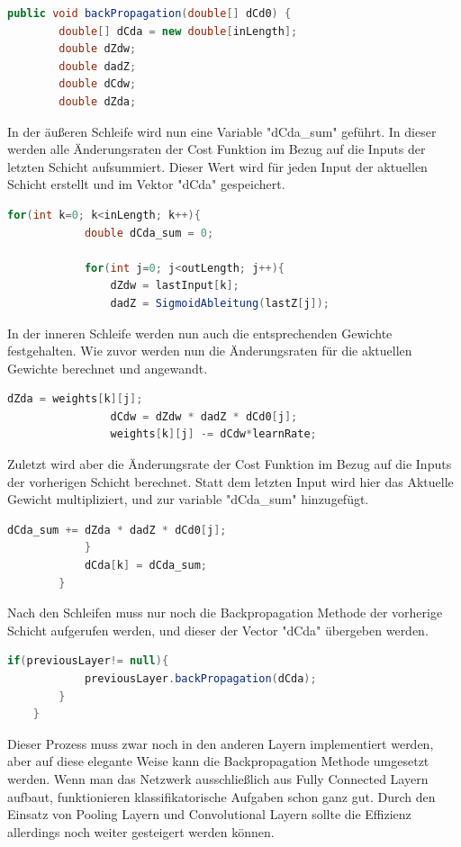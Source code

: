 \documentclass[12pt]{article}
\begin{document}
\begin{lstlisting}[language=Java]
    public void backPropagation(double[] dCd0) {
        double[] dCda = new double[inLength];
        double dZdw;
        double dadZ;
        double dCdw;
        double dZda;
\end{lstlisting} 
In der äußeren Schleife wird nun eine Variable "dCda\_sum" geführt. In dieser werden alle Änderungsraten der Cost Funktion im Bezug auf die Inputs der letzten Schicht aufsummiert. Dieser Wert wird für jeden Input der aktuellen Schicht erstellt und im Vektor "dCda" gespeichert.
\begin{lstlisting}[language=Java]  
        for(int k=0; k<inLength; k++){
            double dCda_sum = 0;

            for(int j=0; j<outLength; j++){
                dZdw = lastInput[k];
                dadZ = SigmoidAbleitung(lastZ[j]);
\end{lstlisting} 
In der inneren Schleife werden nun auch die entsprechenden Gewichte festgehalten. Wie zuvor werden nun die Änderungsraten für die aktuellen Gewichte berechnet und angewandt.
\begin{lstlisting}[language=Java]  
                dZda = weights[k][j]; 
                dCdw = dZdw * dadZ * dCd0[j];
                weights[k][j] -= dCdw*learnRate;
\end{lstlisting} 
Zuletzt wird aber die Änderungsrate der Cost Funktion im Bezug auf die Inputs der vorherigen Schicht berechnet. Statt dem letzten Input wird hier das Aktuelle Gewicht multipliziert, und zur variable "dCda\_sum" hinzugefügt.
\begin{lstlisting}[language=Java]              
                dCda_sum += dZda * dadZ * dCd0[j];
            }
            dCda[k] = dCda_sum;
        }
\end{lstlisting} 
Nach den Schleifen muss nur noch die Backpropagation Methode der vorherige Schicht aufgerufen werden, und dieser der Vector "dCda" übergeben werden.
\begin{lstlisting}[language=Java]   
        if(previousLayer!= null){
            previousLayer.backPropagation(dCda);
        }
    }
\end{lstlisting} 

Dieser Prozess muss zwar noch in den anderen Layern implementiert werden, aber auf diese elegante Weise kann die Backpropagation Methode umgesetzt werden. Wenn man das Netzwerk ausschließlich aus Fully Connected Layern aufbaut, funktionieren klassifikatorische Aufgaben schon ganz gut. Durch den Einsatz von Pooling Layern und Convolutional Layern sollte die Effizienz allerdings noch weiter gesteigert werden können.
\end{document}
